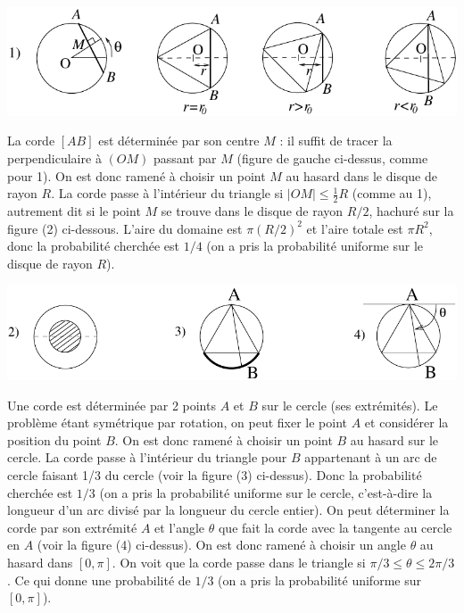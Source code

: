 {{\medskip
\centerline{\includegraphics{../images/img006954-2}}
\medskip
La corde $[AB]$ est déterminée par son centre $M$ : il suffit de
tracer la perpendiculaire à $(OM)$ passant par $M$ (figure de gauche
ci-dessus, comme pour 1). On est donc ramené à choisir un point
$M$ au hasard dans le disque de rayon $R$.
La corde passe à l'intérieur du triangle
si $|OM|\leq \frac{1}{2}R$ (comme au 1), autrement
dit si le point $M$ se trouve dans le disque de rayon $R/2$, hachuré sur
la figure (2) ci-dessous.
L'aire du domaine est $\pi(R/2)^2$ et l'aire
totale est $\pi R^2$, donc la probabilité cherchée est $1/4$
(on a pris la probabilité uniforme sur le disque de rayon $R$).

\medskip
\centerline{\includegraphics{../images/img006954-3}}
\bigskip
Une corde est déterminée par 2 points $A$ et $B$ 
sur le cercle (ses extrémités). Le problème étant symétrique par rotation,
on peut fixer le point $A$ et considérer la position du point $B$.
On est donc ramené à choisir un point $B$ au hasard sur le cercle.
La corde passe à l'intérieur du triangle pour $B$ appartenant à un arc
de cercle faisant 1/3 du cercle (voir la figure (3) ci-dessus).
Donc la probabilité cherchée est $1/3$
(on a pris la probabilité uniforme sur le cercle, c'est-à-dire la longueur
d'un arc divisé par la longueur du cercle entier).
On peut déterminer la corde par son extrémité $A$ et l'angle $\theta$ 
que fait la corde avec la tangente au cercle en $A$
(voir la figure (4) ci-dessus). On est donc ramené à choisir 
un angle $\theta$ au hasard dans $[0,\pi]$.
On voit que
la corde passe dans le triangle si $\pi/3\leq \theta\leq 2\pi/3$. Ce
qui donne une probabilité de $1/3$ (on a pris la probabilité
uniforme sur $[0,\pi]$).
}
}
